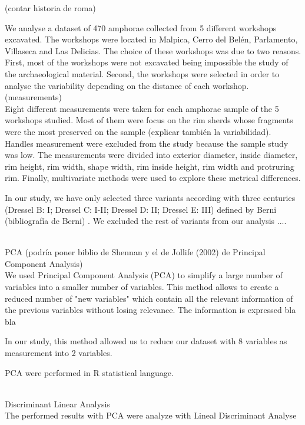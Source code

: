\documentclass[review]{elsarticle}
\begin{document}
(contar historia de roma)


We analyse a dataset of 470 amphorae collected from 5 different workshops excavated. 
The workshops were located in Malpica, Cerro del Belén, Parlamento, Villaseca and Las Delicias. The choice of these workshops was due to two reasons. First, most of the workshops were not excavated being impossible the study of the archaeological material. Second, the workshops were selected in order to  analyse the variability depending on the distance of each workshop. 
\\
(measurements)
\\
Eight different measurements were taken for each amphorae sample of the 5 workshops studied. Most of them were focus on the rim sherds whose fragments were the most preserved on the sample (explicar también la variabilidad). Handles measurement were excluded from the study because the sample study was low. The measurements were divided into exterior diameter, inside diameter, rim height, rim width, shape width, rim inside height, rim width and protruring rim. Finally, multivariate methods were used to explore these metrical differences. 

In our study, we have only selected three variants according with three centuries (Dressel B: I; Dressel C: I-II; Dressel D: II; Dressel E: III) defined by Berni (bibliografía de Berni) . We excluded the rest of variants from our analysis ....

\\
PCA (podría poner biblio de Shennan y el de Jollife (2002) de Principal Component Analysis)
\\
We used Principal Component Analysis (PCA) to simplify a large number of variables into a smaller number of variables. This method allows to create a reduced number of "new variables" which contain all the relevant information of the previous variables without losing relevance. The information is expressed bla bla 
  

In our study, this method allowed us to reduce our dataset with 8 variables as measurement into 2 variables. 

 
PCA were performed in R statistical language. 

\\
Discriminant Linear Analysis
\\
The performed results with PCA were analyze with Lineal Discriminant Analyse 
\end{document}

